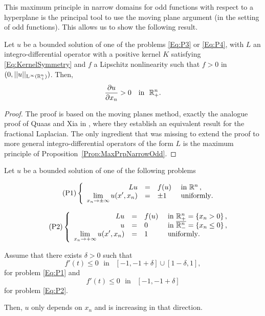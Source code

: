 This maximum principle in narrow domains for odd functions with respect to a hyperplane is the principal tool to use the moving plane argument (in the setting of odd functions). This allows us to show the following result.


\begin{proposition}
	\label{Prop:MonotonyHalfSpace}
	Let $u$ be a bounded solution of one of the problems \eqref{Eq:P3} or \eqref{Eq:P4}, with $L$ an integro-differential operator with a positive kernel $K$ satisfying \eqref{Eq:KernelSymmetry} and $f$ a Lipschitz nonlinearity such that $f>0$ in $(0,||u||_{\mathrm{L}^{\infty}(\mathbb{R}^n_+)})$. Then,
	$$ 
	\frac{\partial u}{\partial x_n} > 0 \,\,\,\, \text{ in } \,\,\mathbb{R}^n_+.
	$$
\end{proposition}


\begin{proof}
	The proof is based on the moving planes method, exactly the analogue proof of Quaas and Xia in \cite{QuaasXia}, where they establish an equivalent result for the fractional Laplacian. The only ingredient that was missing to extend the proof to more general integro-differential operators of the form $L$ is the maximum principle of Proposition~\ref{Prop:MaxPrpNarrowOdd}. 
\end{proof}












\begin{proposition}
\label{Prop:HalfSpaceLimUnif}
Let $u$ be a bounded solution of one of the following problems

\begin{equation}
\leqnomode
\tag{P1}
\label{Eq:P1}
\beqc{\PDEsystem}
L u &=& f(u)  &\textrm{ in }\R^n\,,\\
\ds \lim_{x_n \to \pm \infty} u(x',x_n) &=& \pm 1 \,\,\, &\textrm{ uniformly}.
\eeqc
\end{equation}

\begin{equation}
\leqnomode
\tag{P2}
\label{Eq:P2}
\beqc{\PDEsystem}
L u &=& f(u)  &\textrm{ in }\R^n_+ = \{ x_n>0\} \,,\\ 
u &=& 0  &\textrm{ in }\overline{\R^n_-} = \{ x_n\leq 0\}\,,\\
\ds \lim_{x_n \to + \infty} u(x',x_n) &=& 1 \,\,\, &\textrm{ uniformly}.
\eeqc
\end{equation}

\reqnomode

Assume that there exists $\delta > 0$ such that
$$ f'(t) \leq 0 \,\, \text{ in } \,\,\, [-1,-1+\delta]\cup[1-\delta,1], $$
for problem \eqref{Eq:P1} and
$$ f'(t) \leq 0 \,\, \text{ in } \,\,\, [-1,-1+\delta] $$
for problem \eqref{Eq:P2}.

Then, $u$ only depends on $x_n$ and is increasing in that direction.
\end{proposition}

